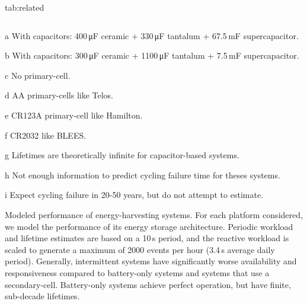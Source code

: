 \begin{definetable}{tab:related}
\begin{threeparttable}
\begin{tabular}{l | c c| c c| c}
  \end{tabular}
    \begin{tablenotes}[para]
      \item[a] With capacitors: 400\,\si{\micro\farad} ceramic + 330\,\si{\micro\farad} tantalum + 67.5\,mF supercapacitor.
      \item[b] With capacitors: 300\,\si{\micro\farad} ceramic + 1100\,\si{\micro\farad} tantalum + 7.5\,mF supercapacitor.
      \item[c] No primary-cell.
      \item[d] AA primary-cells like Telos.
      \item[e] CR123A primary-cell like Hamilton.
      \item[f] CR2032 like BLEES.
      \item[g] Lifetimes are theoretically infinite for capacitor-based systems.
      \item[h] Not enough information to predict cycling failure time for theses systems.
      \item[i] Expect cycling failure in 20-50 years, but do not attempt to estimate.
    \end{tablenotes}
  \end{threeparttable}
  \caption{
  \normalfont
      Modeled performance of energy-harvesting systems.
    For each  platform considered, we model the performance of its energy storage
    architecture. Periodic workload and lifetime estimates are based on a 10\,s
    period, and the reactive workload is scaled to
    generate a maximum of 2000 events per hour (3.4\,s average daily period). Generally,
    intermittent systems have significantly worse availability and responsiveness compared to
    battery-only systems and systems that use a secondary-cell. Battery-only
    systems achieve perfect operation, but have finite, sub-decade lifetimes.
    }
\end{definetable}

